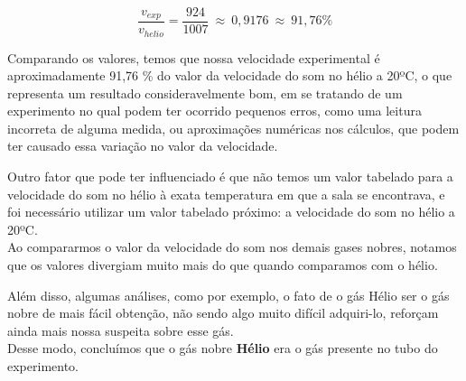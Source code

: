 \[ \frac{v_{exp}}{v_{helio}}=\frac{924}{1007} \ \approx \ 0,9176 \ \approx \ 91,76\%  \]

Comparando os valores, temos que nossa velocidade experimental é aproximadamente 91,76 \% do valor da velocidade do som no hélio a 20ºC, o que representa um resultado consideravelmente bom, em se tratando de um experimento no qual podem ter ocorrido pequenos erros, como uma leitura incorreta de alguma medida, ou aproximações numéricas nos cálculos, que podem ter causado essa variação no valor da velocidade.

Outro fator que pode ter influenciado é que não temos um valor tabelado para a velocidade do som no hélio à exata temperatura em que a sala se encontrava, e foi necessário utilizar um valor tabelado próximo: a velocidade do som no hélio a 20ºC.\\ 

Ao compararmos o valor da velocidade do som nos demais gases nobres, notamos que os valores divergiam muito mais do que quando comparamos com o hélio. 

Além disso, algumas análises, como por exemplo, o fato de o gás Hélio ser o gás nobre de mais fácil obtenção, não sendo algo muito difícil adquiri-lo, reforçam ainda mais nossa suspeita sobre esse gás.\\

Desse modo, concluímos que o gás nobre \textbf{Hélio} era o gás presente no tubo do experimento.
